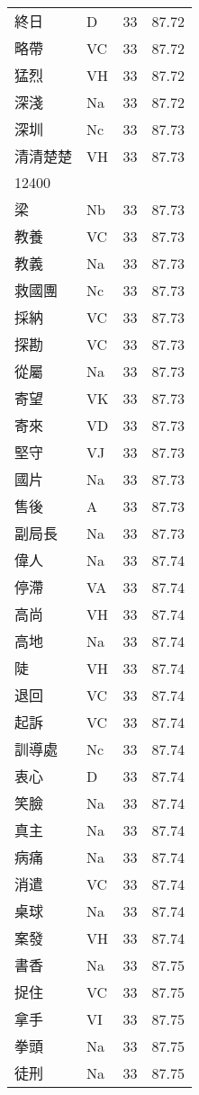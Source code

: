 \documentclass[twocolumn]{book}
\begin{document}
\begin{supertabular}{llrr}
終日 & D & 33 &  87.72\\
略帶 & VC & 33 &  87.72\\
猛烈 & VH & 33 &  87.72\\
深淺 & Na & 33 &  87.72\\
深圳 & Nc & 33 &  87.73\\
清清楚楚 & VH & 33 &  87.73\\
12400\\
梁 & Nb & 33 &  87.73\\
教養 & VC & 33 &  87.73\\
教義 & Na & 33 &  87.73\\
救國團 & Nc & 33 &  87.73\\
採納 & VC & 33 &  87.73\\
探勘 & VC & 33 &  87.73\\
從屬 & Na & 33 &  87.73\\
寄望 & VK & 33 &  87.73\\
寄來 & VD & 33 &  87.73\\
堅守 & VJ & 33 &  87.73\\
國片 & Na & 33 &  87.73\\
售後 & A & 33 &  87.73\\
副局長 & Na & 33 &  87.73\\
偉人 & Na & 33 &  87.74\\
停滯 & VA & 33 &  87.74\\
高尚 & VH & 33 &  87.74\\
高地 & Na & 33 &  87.74\\
陡 & VH & 33 &  87.74\\
退回 & VC & 33 &  87.74\\
起訴 & VC & 33 &  87.74\\
訓導處 & Nc & 33 &  87.74\\
衷心 & D & 33 &  87.74\\
笑臉 & Na & 33 &  87.74\\
真主 & Na & 33 &  87.74\\
病痛 & Na & 33 &  87.74\\
消遣 & VC & 33 &  87.74\\
桌球 & Na & 33 &  87.74\\
案發 & VH & 33 &  87.74\\
書香 & Na & 33 &  87.75\\
捉住 & VC & 33 &  87.75\\
拿手 & VI & 33 &  87.75\\
拳頭 & Na & 33 &  87.75\\
徒刑 & Na & 33 &  87.75\\

\end{supertabular}
\end{document}
